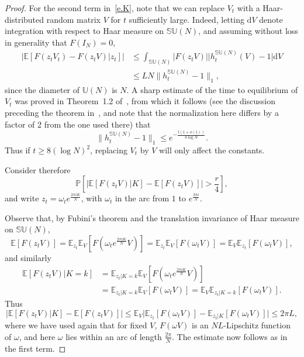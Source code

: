 \documentclass[11pt]{article}
\theoremstyle{definition}
\numberwithin{equation}{section}
\numberwithin{figure}{section}
\numberwithin{table}{section}
\newcommand{\Unitary}[1]{\mathbb{U}\left(#1\right)}
\newcommand{\SUnitary}[1]{\mathbb{SU}\left(#1\right)}
\newcommand{\E}{\mathbb{E}}
\newcommand{\Prob}{\mathbb{P}}
\newcommand*{\dd}{\mathrm{d}}
\newcommand*{\dV}{\dd V}
\begin{document}
\begin{proof}
For the second term in~\eqref{e.K}, note that we can replace $V_t$ with a Haar-distributed random matrix $V$ for $t$ sufficiently large. Indeed, letting $\dV$ denote integration with respect to Haar measure on $\SUnitary{N}$, and assuming without loss in generality that $F(I_N)=0$,
\begin{equation}\label{eC}
\begin{split}
\left|\E\left[F(z_tV_t)-F(z_tV)\big|z_t\right]\right|&\le\int_{\SUnitary{N}}\big|F(z_tV)\big|\big|h^{\SUnitary{N}}_t(V)-1\big|\dV\\&\le LN\|h^{\SUnitary{N}}_t-1\|_1,
\end{split}
\end{equation}
since the diameter of $\Unitary{N}$ is $N$. A sharp estimate of the time to equilibrium of $V_t$ was proved in Theorem~1.2 of~\cite{SC1994b}, from which it follows (see the discussion preceding the theorem in~\cite{SC1994b}, and note that the normalization here differs by a factor of 2 from the one used there) that
\begin{equation}\label{eD}
\|h^{\SUnitary{N}}_t-1\|_1\le e^{-\frac{t(1+o(1))}{8\log N}}.
\end{equation}
Thus if $t\ge8(\log N)^2$, replacing $V_t$ by $V$ will only affect the constants.

Consider therefore
\[
\Prob\left[\Big|\E\left[F(z_tV)\big|K\right]-\E[F(z_tV)]\Big|>\frac{r}{4}\right],
\]
and write $z_t=\omega_te^{\frac{2\pi i K}{N}}$, with $\omega_t$ in the arc from $1$ to $e^{\frac{2\pi i}{N}}$.

Observe that, by Fubini's theorem and the translation invariance of Haar measure on $\SUnitary{N}$,
\[
\E[F(z_tV)]=\E_{z_t}\E_V[F(\omega_te^{\frac{2\pi i K}{N}}V)]=\E_{z_t}\E_V[F(\omega_tV)]=\E_V\E_{z_t}[F(\omega_tV)],
\]
and similarly
\begin{align*}
\E[F(z_tV)|K=k] &=\E_{z_t|K=k}\E_V[F(\omega_te^{\frac{2\pi i K}{N}}V)] \\
&=\E_{z_t|K=k}\E_V[F(\omega_tV)] =\E_V \E_{z_t|K=k}[F(\omega_tV)].
\end{align*}
Thus
\[
\Big|\E\left[F(z_tV)\big|K\right]-\E[F(z_tV)]\Big|\le\E_V\Big|\E_{z_t}[F(\omega_tV)]-\E_{z_t|K}[F(\omega_tV)]\Big|\le2\pi L,
\]
where we have used again that for fixed $V$, $F(\omega V)$ is an $NL$-Lipschitz function of $\omega$, and here $\omega$ lies within an arc of length $\frac{2\pi}{N}$. The estimate now follows as in the first term.
\end{proof}
\end{document}
